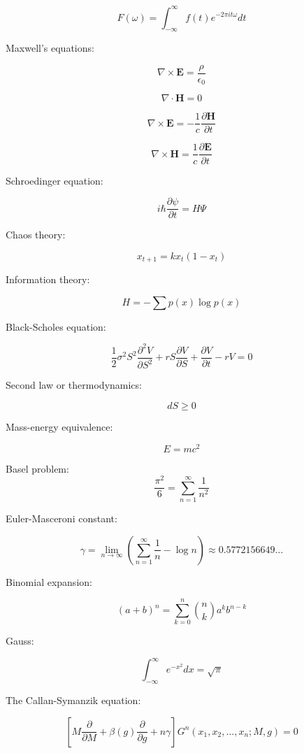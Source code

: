 \documentclass{article}
\begin{document}
\[
  F(\omega) = \int_{-\infty}^\infty f(t) e^{-2\pi i t \omega} dt
\]

Maxwell's equations: 

\begin{equation}
\nabla \times \textbf{E}=\frac{\rho}{\epsilon_0}
\end{equation}

\begin{equation}
\nabla \cdot \textbf{H}=0
\end{equation}

\begin{equation}
\nabla \times \textbf{E}=-\frac 1c\frac{\partial \textbf{H}}{\partial t}
\end{equation}

\begin{equation}
\nabla \times \textbf{H}=\frac 1c\frac{\partial \textbf{E}}{\partial t}
\end{equation}

Schroedinger equation:

\[
i \hbar \frac{\partial \psi}{\partial t} = H\Psi
\]

Chaos theory:

$$x_{t+1}=kx_t(1-x_t)$$

Information theory:

\[
  H=-\sum p(x)\log p(x)
\]

Black-Scholes equation:

$$\frac12\sigma^2S^2\frac{\partial^2V}{\partial S^2}+rS\frac{\partial V}{\partial S}+\frac{\partial V}{\partial t}-rV=0$$

Second law or thermodynamics:

$$dS\ge 0$$

Mass-energy equivalence:

$$E=mc^2$$

Basel problem:
\[
  \frac{\pi^2}{6}=\sum_{n=1}^\infty \frac{1}{n^2}
\]

Euler-Masceroni constant:

\[
\gamma = \lim_{n\to\infty}(\sum_{n=1}^\infty \frac{1}{n}-\log n)\approx 0.5772156649\ldots
\]

Binomial expansion:

\[
  (a+b)^n = \sum_{k=0}^n \binom{n}{k} a^k b^{n-k}  
\]

Gauss:

$$\int_{-\infty}^\infty e^{-x^2} dx = \sqrt{\pi}$$

The Callan-Symanzik equation:

\[
\left[M\frac{\partial}{\partial M}+\beta(g)\frac{\partial}{\partial g}+n\gamma\right]G^n(x_1,x_2,...,x_n;M,g)=0
\]
\end{document}
